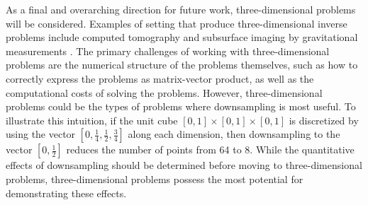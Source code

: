 \documentclass[12pt,notitlepage]{report}
\begin{document}
As a final and overarching direction for future work, three-dimensional problems will be considered. Examples of setting that produce three-dimensional inverse problems include computed tomography and subsurface imaging by gravitational measurements \cite{ABT}. The primary challenges of working with three-dimensional problems are the numerical structure of the problems themselves, such as how to correctly express the problems as matrix-vector product, as well as the computational costs of solving the problems. However, three-dimensional problems could be the types of problems where downsampling is most useful. To illustrate this intuition, if the unit cube $[0,1] \times [0,1] \times [0,1]$ is discretized by using the vector $[0,\frac{1}{4},\frac{1}{2},\frac{3}{4}]$ along each dimension, then downsampling to the vector $[0,\frac{1}{2}]$ reduces the number of points from 64 to 8. While the quantitative effects of downsampling should be determined before moving to three-dimensional problems, three-dimensional problems possess the most potential for demonstrating these effects. 



\end{document}

